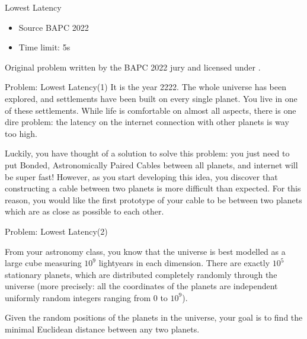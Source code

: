 \documentclass[11pt,pdf, aspectratio=169]{beamer}
\begin{document}
  \begin{frame}{Lowest Latency}
    \begin{itemize}
      \item Source BAPC 2022
      \item Time limit: 5s
    \end{itemize}
    Original problem written by the BAPC 2022 jury and licensed under \doclicenseLongNameRef.

    \doclicenseImage
  \end{frame}
  \begin{frame}{Problem: Lowest Latency(1)}
    It is the year 2222.
    The whole universe has been explored, and settlements have been built on every single planet.
    You live in one of these settlements.
    While life is comfortable on almost all aspects, there is one dire problem:
    the latency on the internet connection with other planets is way too high.

    Luckily, you have thought of a solution to solve this problem:
    you just need to put Bonded, Astronomically Paired Cables between all planets,
    and internet will be super fast!
    However, as you start developing this idea,
    you discover that constructing a cable between two planets is more difficult than expected.
    For this reason, you would like the first prototype of your cable to be between two planets which are as close as possible to each other.

  \end{frame}
  \begin{frame}{Problem: Lowest Latency(2)}

    From your astronomy class, you know that the universe is best modelled as a large cube measuring $10^9$ lightyears in each dimension.
    There are exactly $10^5$ stationary planets, which are distributed completely randomly through the universe
    (more precisely: all the coordinates of the planets are independent uniformly random integers ranging from $0$ to $10^9$).

    Given the random positions of the planets in the universe, your goal is to find the minimal Euclidean distance between any two planets.
  \end{frame}
\end{document}
